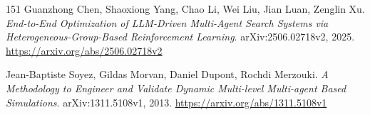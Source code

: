 \documentclass[11pt,a4paper]{article}
\begin{document}
\begin{thebibliography}{151}
Guanzhong Chen, Shaoxiong Yang, Chao Li, Wei Liu, Jian Luan, Zenglin Xu.
\newblock \emph{End-to-End Optimization of LLM-Driven Multi-Agent Search Systems via Heterogeneous-Group-Based Reinforcement Learning}.
\newblock arXiv:2506.02718v2, 2025.
\newblock \url{https://arxiv.org/abs/2506.02718v2}

Jean-Baptiste Soyez, Gildas Morvan, Daniel Dupont, Rochdi Merzouki.
\newblock \emph{A Methodology to Engineer and Validate Dynamic Multi-level Multi-agent Based Simulations}.
\newblock arXiv:1311.5108v1, 2013.
\newblock \url{https://arxiv.org/abs/1311.5108v1}

\end{thebibliography}
\end{document}

